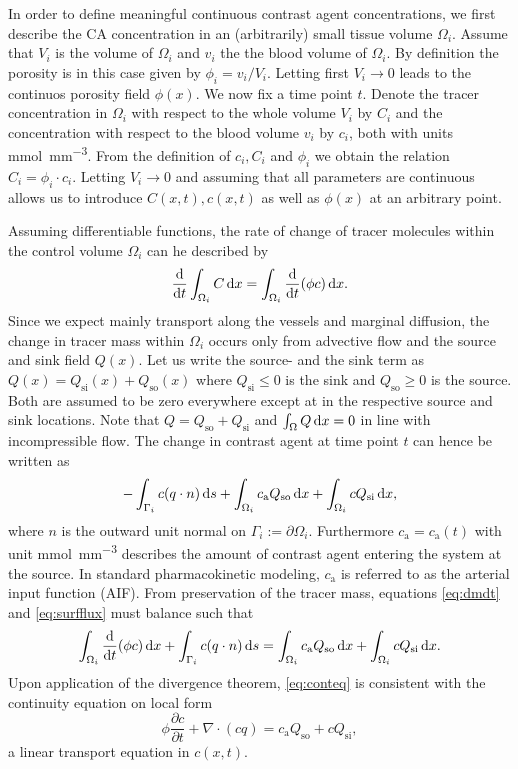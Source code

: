 \documentclass[paper=a4, fontsize=12pt,parskip=half,draft,headings=small]{scrartcl}
\newcommand{\Qso}{Q_{\mathrm{so}}}
\newcommand{\Qsi}{Q_{\mathrm{si}}}
\newcommand{\ca}{c_\mathrm{a}}
\begin{document}
	In order to define meaningful continuous contrast agent concentrations, we first describe the CA concentration in an (arbitrarily) small tissue volume $\Omega_i$.
	Assume that $V_i$ is the volume of $\Omega_i$ and $v_i$ the the blood volume of $\Omega_i$.
	By definition the porosity is in this case given by $\phi_i = v_i/V_i$.
	Letting first $V_i \rightarrow 0$ leads to the continuos porosity field $\phi(x)$.	
	We now fix a time point $t$.
	Denote the tracer concentration in $\Omega_i$ with respect to the whole volume $V_i$ by $C_i$ and the concentration with respect to the blood volume $v_i$ by $c_i$, both with units \si{\milli\mol\per\cubic\milli\meter}. 
	From the definition of $c_i,C_i$ and $\phi_i$ we obtain the relation $C_i = \phi_i \cdot c_i$.
	Letting $V_i \to 0$ and assuming that all parameters are continuous allows us to introduce $C(x,t),c(x,t)$ as well as $\phi(x)$ at an arbitrary point.

	Assuming differentiable functions, the rate of change of tracer molecules within the control volume $\Omega_i$ can he described by
	\begin{equation}
		\frac{\mathrm{d}}{\mathrm{d} t}\int_{\Omega_i}C \,\mathrm{d} x = \int_{\Omega_i}\frac{\mathrm{d}}{\mathrm{d} t}(\phi c) \,\mathrm{d} x.
		\label{eq:dmdt}
	\end{equation}	
	Since we expect mainly transport along the vessels and marginal diffusion, the change in tracer mass within $\Omega_i$ occurs only from advective flow and the source and sink field $Q(x)$.
	Let us write the source- and the sink term as $Q(x) = \Qsi(x) + \Qso(x)$ where $\Qsi \le 0$ is the sink and $\Qso \ge 0$ is the source. 
	Both are assumed to be zero everywhere except at in the respective source and sink locations.
	Note that $Q = \Qso + \Qsi$ and $\int_\Omega Q \,\mathrm{d} x =0$ in line with incompressible flow. 
	The change in contrast agent at time point $t$ can hence be written as
	\begin{equation}
		-\int_{ \Gamma_i}c(q \cdot n)\diffint s + \int_{\Omega_i}\ca \Qso \diffint x + \int_{\Omega_i}c\Qsi \diffint x,
		\label{eq:surfflux}
	\end{equation}
	where $n$ is the outward unit normal on $\Gamma_i := \partial \Omega_i$.
	Furthermore $\ca = \ca(t)$ with unit \si{\milli\mol\per\cubic\milli\meter} describes the amount of contrast agent entering the system at the source. 
	In standard pharmacokinetic modeling, $\ca$ is referred to as the arterial input function (AIF).
	From preservation of the tracer mass, equations \eqref{eq:dmdt} and \eqref{eq:surfflux} must balance such that
	\begin{equation}
		\int_{\Omega_i}\diffop{t} (\phi c) \diffint x + \int_{ \Gamma_i}c(q \cdot n) \diffint s = \int_{\Omega_i}\ca\Qso \diffint x + \int_{\Omega_i}c \Qsi \diffint x.
		\label{eq:conteq}
	\end{equation}
	Upon application of the divergence theorem, \eqref{eq:conteq} is consistent with the continuity equation on local form
	\begin{equation}
		\phi \frac{\partial c}{\partial t} + \nabla \cdot (cq) = \ca\Qso + c\Qsi,
		\label{eq:conteqlocal}
	\end{equation}
	a linear transport equation in $c(x,t)$. 
	
\end{document}

